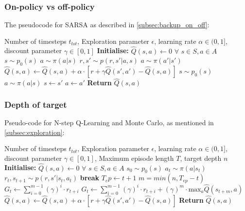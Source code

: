 \documentclass{article}
\theoremstyle{plain}
\theoremstyle{definition}
\theoremstyle{remark}
\begin{document}
{\subsubsection{On-policy vs off-policy}
\vspace{-2mm}
The pseudocode for SARSA as described in \autoref{subsec:backup_on_off}:\\
\vspace{-4mm}
\begin{algorithm}[H]
\caption{Tabular SARSA}
\label{alg:SARSA}
\begin{algorithmic}
     Number of timesteps $t_{tot}$, Exploration parameter $\epsilon$, learning rate $\alpha\in(0,1]$, discount parameter $\gamma\in[0,1]$
   \STATE \textbf{Initialise:} $\hat{Q}(s,a)\leftarrow0$ $\forall$ $s\in S, a\in A$
   \STATE $s\sim p_0(s)$
   \STATE $a\sim \pi(a|s)$
   \STATE $r, s'\sim p(r, s'|a, s)$
   \STATE $a \sim \pi(a'|s')$
   \STATE $\hat{Q}(s, a) \leftarrow \hat{Q}(s, a) + \alpha\cdot[r+\gamma \hat{Q}(s', a')-\hat{Q}(s, a)]$
   \STATE $s\sim p_0(s)$
   \STATE $a\sim \pi(a|s)$
   \ELSE
   \STATE $s\leftarrow s'$
   \STATE $a\leftarrow a'$
   \ENDIF
   \ENDWHILE
   \STATE \textbf{Return} $\hat{Q}(s, a)$
\end{algorithmic}
\end{algorithm}
\vspace{-3mm}

\subsubsection{Depth of target}
Pseudo-code for N-step Q-Learning and Monte Carlo, as mentioned in 
\autoref{subsec:exploration}:
\vspace{-3mm}
\begin{algorithm}[H]
\caption{N-step Q-learning}
\label{alg:N_step_q_learning}
\begin{algorithmic}
     Number of timesteps $t_{tot}$, Exploration parameter $\epsilon$, learning rate $\alpha\in(0,1]$, discount parameter $\gamma\in[0,1]$, Maximum episode length $T$, target depth $n$
   \STATE \textbf{Initialise:} $\hat{Q}(s,a)\leftarrow0$ $\forall$ $s\in S, a\in A$
    \STATE $s_0\sim p_0(s)$
    \STATE $a_t\sim \pi(a|s_t)$
    \STATE $r_t, s_{t+1}\sim p(r, s'|s_t, a_t)$
    \STATE \textbf{break}
    \ENDIF
    \ENDFOR
    \STATE $T_ep \leftarrow t+1$
    \STATE $m=min(n, T_{ep}-t)$
    \STATE $G_t\leftarrow\sum^{m-1}_{i=0}(\gamma)^i\cdot r_{t+i}$
    \ELSE
    \STATE $G_t\leftarrow\sum^{m-1}_{i=0}(\gamma)^i\cdot r_{t+i}+(\gamma)^m \cdot \text{max}_a \hat{Q}(s_{t+m}, a)$
    \ENDIF
    \STATE $\hat{Q}(s, a) \leftarrow \hat{Q}(s, a) + \alpha\cdot[r+\gamma \hat{Q}(s', a')-\hat{Q}(s, a)]$
    \ENDFOR
    \ENDWHILE
    \STATE \textbf{Return} $\hat{Q}(s, a)$
\end{algorithmic}
\end{algorithm}

}
\end{document}
